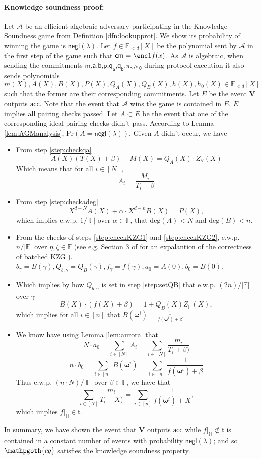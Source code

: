 \documentclass[11pt]{article} %
\newcommand{\cq}{\ensuremath{\mathpgoth{cq} }\xspace}
\newcommand{\F}{\ensuremath{\mathbb F}\xspace}
\newcommand{\adv}{\ensuremath{\mathcal A}\xspace}
\newcommand{\cm}{\ensuremath{\mathsf{cm}}\xspace}
\renewcommand{\deg}{\ensuremath{\mathrm{deg}}\xspace}
\newcommand{\negl}{\ensuremath{\mathsf{negl}(\lambda)}\xspace}
\newcommand{\acc}{\ensuremath{\mathsf{acc}}\xspace}
\newcommand{\ver}{\ensuremath{\mathsf{\mathbf{V}}}\xspace}
\newcommand{\hgen}{\ensuremath{\mathbf{\omega}}\xspace}
\newcommand{\polysofdeg}[1]{\ensuremath{\F_{< #1}[X]}\xspace}
\newcommand{\prob}{\ensuremath{\mathrm{Pr}}\xspace}
\newcommand{\restricttoset}[2]{\ensuremath{#1|_{#2}}\xspace}
\newcommand{\subspace}{\ensuremath{\mathbb{H}}\xspace}
\newcommand{\bigspace}{\ensuremath{\mathbb{V}}\xspace}
\newcommand{\witsize}{\ensuremath{n}\xspace}
\newcommand{\tabsize}{\ensuremath{N}\xspace}
\newcommand{\tab}{\ensuremath{\mathfrak{t}}\xspace}
\renewcommand{\a}{\ensuremath{\mathsf{a}}\xspace}
\renewcommand{\b}{\ensuremath{\mathsf{b}}\xspace}
\renewcommand{\p}{\ensuremath{\mathsf{p}}\xspace}
\newcommand{\qa}{\ensuremath{\mathsf{q_a}}\xspace}
\newcommand{\qb}{\ensuremath{\mathsf{q_b}}\xspace}
\newcommand{\m}{\ensuremath{\mathsf{m}}\xspace}
\newcommand{\gamproof}{\ensuremath{\mathsf{\pi_\gamma}}\xspace}
\newcommand{\zerproof}{\ensuremath{\mathsf{\pi_0}}\xspace}
\newcommand{\bgam}{\ensuremath{b_\gamma}\xspace}
\newcommand{\qbgam}{\ensuremath{Q_{b,\gamma}}\xspace}
\newcommand{\fgam}{\ensuremath{f_{\gamma}}\xspace}
\begin{document}
\paragraph{Knowledge soundness proof:}
Let \adv be an efficient algebraic adversary participating in the Knowledge Soundness game from
Definition \ref{dfn:lookupprot}.
We show its probability of winning the game is \negl.
Let $f\in \polysofdeg{d}$ be the polynomial sent by \adv in the first step of the game
such that $\cm=\enc1{f(x)}$.
As \adv is algebraic, when sending the commitments \m,\a,\b,\p,\qa,\qb,\gamproof,\zerproof during protocol execution it also sends polynomials $m(X),A(X),B(X),P(X),Q_A(X),Q_B(X),h(X),h_0(X)\in \polysofdeg{d}$ such that the former are their corresponding commitments.
Let $E$ be the event \ver outputs \acc.
Note that the event that \adv wins the game is contained in $E$. 
$E$ implies all pairing checks passed.
Let $A\subset E$ be the event that one of the corresponding ideal pairing checks didn't pass.
According to Lemma \ref{lem:AGManalysis}, $\prob(A=\negl)$.
Given $A$ didn't occur, we have
\begin{itemize}
 \item From step \ref{step:checkqa} \[A(X)(T(X)+\beta)-M(X) = Q_A(X)\cdot Z_\bigspace(X)\]
Which means that for all $i\in [\tabsize]$,
\[A_i=\frac{M_i}{T_i+\beta}\]

\item From step  \ref{step:checkadeg}
\[X^{d-\tabsize}A(X)+\alpha\cdot X^{d-\witsize}B(X)=P(X),\]
which implies e.w.p. $1/|\F|$ over $\alpha\in \F$, that $\deg(A)<\tabsize$ and $\deg(B)<\witsize$.

\item From the checks of steps \ref{step:checkKZG1} and \ref{step:checkKZG2},  e.w.p. $\witsize/|\F|$ over $\eta,\zeta\in\F$ (see e.g. Section 3 of \cite{plonk} for an expalantion of the correctness of batched KZG \cite{kate}). 
$\bgam = B(\gamma),\qbgam =Q_B(\gamma),\fgam =f(\gamma),a_0=A(0),b_0=B(0)$.

\item Which implies by how \qbgam is set in step \ref{step:setQB}  that e.w.p. $(2\witsize)/|\F|$ over $\gamma$ 
\[B(X)\cdot (f(X)+\beta)=1+ Q_B(X)Z_\subspace(X),\]
which implies for all $i\in [\witsize]$ that
$B(\hgen^i)=\frac{1}{f(\hgen^i)+\beta}$.
\item We know have using Lemma \ref{lem:aurora} that
\[\tabsize\cdot a_0 = \sum_{i\in [\tabsize]} A_i = \sum_{i\in [\tabsize]}\frac{m_i}{T_i+\beta)}\]
\[\witsize\cdot b_0 = \sum_{i\in [\witsize]} B(\hgen^i) = \sum_{i\in [\witsize]}\frac{1}{f(\hgen^i)+\beta}\]
Thus e.w.p. $(\witsize\cdot \tabsize)/|\F|$ over $\beta\in \F$, we have that
\[\sum_{i\in [\tabsize]}\frac{m_i}{T_i+X)}=\sum_{i\in [\witsize]}\frac{1}{f(\hgen^i)+X},\]
which implies $\restricttoset{f}{\subspace}\in \tab$.
\end{itemize}
In summary, we have shown the event that \ver outputs \acc while $\restricttoset{f}{\subspace}\not\subset \tab$
is contained in a constant number of events with probability \negl; and so \cq satisfies the knowledge soundness property.
\end{document}
